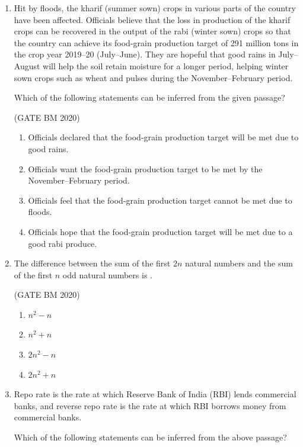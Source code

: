 \documentclass[journal]{IEEEtran}
\begin{document}
\begin{enumerate}
\item Hit by floods, the kharif (summer sown) crops in various parts of the country have been affected. Officials believe that the loss in production of the kharif crops can be recovered in the output of the rabi (winter sown) crops so that the country can achieve its food-grain production target of 291 million tons in the crop year 2019–20 (July–June). They are hopeful that good rains in July–August will help the soil retain moisture for a longer period, helping winter sown crops such as wheat and pulses during the November–February period.  

Which of the following statements can be inferred from the given passage?  


\hfill(GATE BM 2020)
\begin{enumerate}
  \item Officials declared that the food-grain production target will be met due to good rains.
  \item Officials want the food-grain production target to be met by the November–February period.
  \item Officials feel that the food-grain production target cannot be met due to floods.
  \item Officials hope that the food-grain production target will be met due to a good rabi produce.
\end{enumerate}


\item The difference between the sum of the first $2n$ natural numbers and the sum of the first $n$ odd natural numbers is  \underline{\hspace{2cm}}. 

	\hfill(GATE BM 2020)
\begin{multicols}{4}
\begin{enumerate}
  \item $n^2 - n$
  \item $n^2 + n$
  \item $2n^2 - n$
  \item $2n^2 + n$
\end{enumerate}
\end{multicols}


\item Repo rate is the rate at which Reserve Bank of India (RBI) lends commercial banks, and reverse repo rate is the rate at which RBI borrows money from commercial banks.  

Which of the following statements can be inferred from the above passage?  



\end{enumerate}
\end{document}

